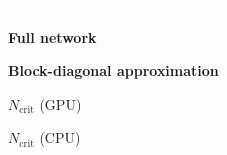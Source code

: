 \begin{table}[tb]
\begin{minipage}{0.245\linewidth}
    \begin{small}
      
    \end{small}
  \end{minipage}
  \hfill
  \begin{minipage}{0.245\linewidth}
  \textcolor{white}{.}

  \end{minipage}
  
  
\vspace{5ex}
  
  
  
  \begin{small}
    \textbf{\cifarhun \allcnnc}
  \end{small}

  \begin{minipage}{0.49\linewidth}
    \centering
    \begin{small}
      \textbf{Full network}
    \end{small}
  \end{minipage}
  \hfill
  \begin{minipage}{0.49\linewidth}
    \centering
    \begin{small}
      \textbf{Block-diagonal approximation}
    \end{small}
  \end{minipage}
  \vspace{1ex}

  \begin{minipage}{0.245\linewidth}
    \centering
    \begin{small}
      $N_{\text{crit}}$ (GPU)
    \end{small}
    \vspace{0.15\baselineskip}

    \begin{small}
      
    \end{small}
  \end{minipage}
  \hfill
  \begin{minipage}{0.245\linewidth}
    \centering
    \begin{small}
      $N_{\text{crit}}$ (CPU)
    \end{small}
    \vspace{0.15\baselineskip}


\end{minipage}
\end{table}
